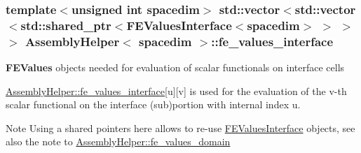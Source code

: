 \subsubsection[{\texorpdfstring{fe\+\_\+values\+\_\+interface}{fe_values_interface}}]{\setlength{\rightskip}{0pt plus 5cm}template$<$unsigned int spacedim$>$ std\+::vector$<$std\+::vector$<$std\+::shared\+\_\+ptr$<${\bf F\+E\+Values\+Interface}$<$spacedim$>$ $>$ $>$ $>$ {\bf Assembly\+Helper}$<$ spacedim $>$\+::fe\+\_\+values\+\_\+interface\hspace{0.3cm}{\ttfamily [private]}}\hypertarget{class_assembly_helper_ae1e2643696005415d78421882ca80e8e}{}\label{class_assembly_helper_ae1e2643696005415d78421882ca80e8e}
{\bf F\+E\+Values} objects needed for evaluation of scalar functionals on interface cells

\hyperlink{class_assembly_helper_ae1e2643696005415d78421882ca80e8e}{Assembly\+Helper\+::fe\+\_\+values\+\_\+interface}\mbox{[}{\ttfamily u}\mbox{]}\mbox{[}{\ttfamily v}\mbox{]} is used for the evaluation of the {\ttfamily v-\/th} scalar functional on the interface (sub)portion with internal index {\ttfamily u}.

\begin{DoxyNote}{Note}
Using a shared pointers here allows to re-\/use \hyperlink{class_f_e_values_interface}{F\+E\+Values\+Interface} objects, see also the note to \hyperlink{class_assembly_helper_a904a24f53b66e1c1ef89f1bb7989eb32}{Assembly\+Helper\+::fe\+\_\+values\+\_\+domain} 
\end{DoxyNote}
